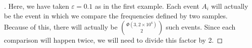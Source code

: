 \documentclass[]{book}
\theoremstyle{definition}
\begin{document}
\begin{enumerate}
\begin{proof}[\unskip\nopunct]
Here, we have taken $\varepsilon = 0.1$ as in the first example. Each event $A_{i}$ will actually be the event in which we compare the frequencies defined by two samples. Because of this, there will actually be ${\Phi(3,2\times10^{4}) \choose 2}$ such events. Since each comparison will happen twice, we will need to divide this factor by 2.
\end{proof}


\end{enumerate}
\end{document}
